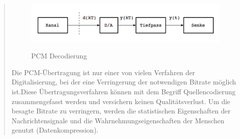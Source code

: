 \begin{quote}
	\begin{figure}[H]
    \centering
        \includegraphics[scale=0.7, trim = 0cm 0cm 0cm 0cm, clip]{./Bilder/PCM_Decodierung}
            \caption{PCM Decodierung}
            \cite{PCM_Decodierung}
    \end{figure}
    
	
	Die PCM-Übertragung ist nur einer von vielen Verfahren der
	Digitalisierung, bei der eine Verringerung der notwendigen Bitrate möglich
	ist.Diese Übertragungsverfahren können mit dem Begriff Quellencodierung
	zusammengefasst werden und versichern keinen Qualitätsverlust. Um die besagte Bitrate zu verringern,
	werden die statistischen Eigenschaften der Nachrichtensignale und die
	Wahrnehmungseigenschaften der Menschen genutzt (Datenkompression).
	
	
	\end{quote}%

